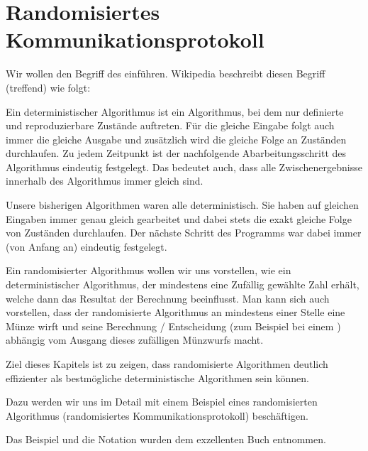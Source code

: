 \chapter{Randomisiertes Kommunikationsprotokoll}
Wir wollen den Begriff des  einführen. Wikipedia beschreibt diesen Begriff (treffend) wie folgt:

\begin{mydefinition}
Ein deterministischer Algorithmus ist ein Algorithmus, bei dem nur definierte und reproduzierbare Zustände auftreten.
Für die gleiche Eingabe folgt auch immer die gleiche Ausgabe und zusätzlich wird die gleiche Folge an Zuständen durchlaufen.
Zu jedem Zeitpunkt ist der nachfolgende Abarbeitungsschritt des Algorithmus eindeutig festgelegt.
Das bedeutet auch, dass alle Zwischenergebnisse innerhalb des Algorithmus immer gleich sind.
\end{mydefinition}

Unsere bisherigen Algorithmen waren alle deterministisch. Sie haben auf gleichen Eingaben immer genau gleich gearbeitet und dabei stets die exakt gleiche Folge von Zuständen durchlaufen. Der nächste Schritt des Programms war dabei immer (von Anfang an) eindeutig festgelegt.

Ein randomisierter Algorithmus wollen wir uns vorstellen, wie ein deterministischer Algorithmus, der mindestens eine Zufällig gewählte Zahl erhält, welche dann das Resultat der Berechnung beeinflusst.
Man kann sich auch vorstellen, dass der randomisierte Algorithmus an mindestens einer Stelle eine Münze wirft und seine Berechnung / Entscheidung (zum Beispiel bei einem ) abhängig vom Ausgang dieses zufälligen Münzwurfs macht.

Ziel dieses Kapitels ist zu zeigen, dass randomisierte Algorithmen deutlich effizienter als bestmögliche deterministische Algorithmen sein können.

Dazu werden wir uns im Detail mit einem Beispiel eines randomisierten Algorithmus (randomisiertes Kommunikationsprotokoll) beschäftigen.

Das Beispiel und die Notation wurden dem exzellenten Buch \cite{TheoretischeInformatik} entnommen.

